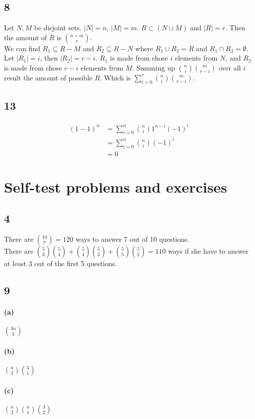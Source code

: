 \documentclass[letter]{article}
\begin{document}
\subsection*{8}
Let $N,M$ be disjoint sets. $|N| = n$, $|M| = m$. $R\subset (N \cup M)$ and
$|R|=r$. Then the amount of $R$ is ${n+m \choose r}$.\\
We can find $R_1 \subseteq R-M$ and $R_2 \subseteq R-N$ where $R_1 \cup R_2 =
R$ and $R_1 \cap R_2 = \emptyset$. Let $|R_1|=i$, then $|R_2|=r-i$. $R_1$ is
made from chose $i$ elements from $N$, and $R_2$ is made from chose $r-i$
elements from $M$. Summing up ${n \choose i}{m \choose r-i}$ over all $i$ result
the amount of possible $R$. Which is $\sum_{i=0}^r {n \choose i}{m \choose
r-i}$.
\subsection*{13}
\begin{align}
(1-1)^n&=\sum_{i=0}^n {n \choose i} 1^{n-i}(-1)^i\\
&=\sum_{i=0}^n {n \choose i}(-1)^i\\
&=0
\end{align}

\section*{Self-test problems and exercises}
\subsection*{4}
There are ${10 \choose 7}=120$ ways to answer 7 out of 10 questions.\\
There are ${5 \choose 3}{5 \choose 4}+{5 \choose 4}{5 \choose 3}+{5 \choose 5}{5
\choose 2}=110$ ways if she have to answer at least 3 out of the first 5
questions.

\subsection*{9}
\paragraph*{(a)}
${3n \choose 3}$
\paragraph*{(b)}
${n \choose 3}{3 \choose 1}$
\paragraph*{(c)}
${n \choose 2}{n \choose 1}{3 \choose 2}$
\end{document}
